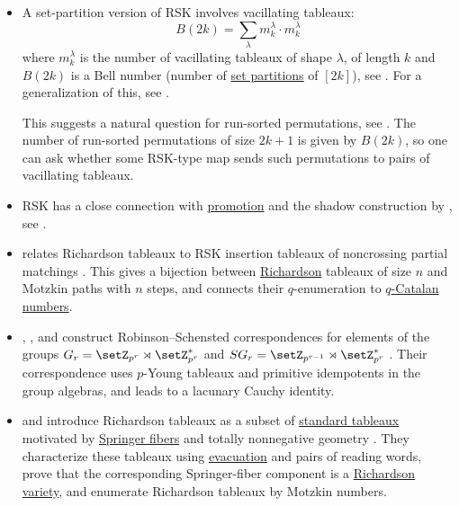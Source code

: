 \begin{itemize}
\item A set-partition version of RSK involves vacillating tableaux:
\[
  B(2k) = \sum_{\lambda} m^{\lambda}_k \cdot m^{\lambda}_k
\]
where $m^{\lambda}_k$ is the number of vacillating tableaux of shape $\lambda$,
of length $k$ and $B(2k)$ is a Bell number (number of
\hyperref[setPartitions]{set partitions} of $[2k]$), see
\cite{HalversonLewandowski2005}.
For a generalization of this, see \cite{BerikkyzyHarrisPunYanZhao2022x}.

This suggests a natural question for run-sorted permutations, see
\cite{AlexanderssonNabawanda2021}.  The number of run-sorted permutations of
size $2k+1$ is given by $B(2k)$, so one can ask whether some RSK-type map sends
such permutations to pairs of vacillating tableaux.


\item RSK has a close connection with \hyperref[promotion]{promotion} and the
shadow construction by , see
\cite{PfannererSwanson2025x}.

\item {} relates Richardson tableaux to RSK insertion tableaux of
noncrossing partial matchings \cite{Guo2025x}.  This gives a bijection between
\hyperref[richardsonVarieties]{Richardson} tableaux of size $n$ and Motzkin
paths with $n$ steps, and connects their $q$-enumeration to
\hyperref[prelimQanalogsCatalan]{$q$-Catalan numbers}.

\item {}, , and  construct
Robinson--Schensted correspondences for elements of the groups
$G_r=\setZ_{p^r}\rtimes \setZ_{p^r}^\ast$ and
$SG_r=\setZ_{p^{r-1}}\rtimes \setZ_{p^r}^\ast$
\cite{ParvathiTamilselviHepsi2025x}.  Their correspondence uses
$p$-Young tableaux and primitive idempotents in the group algebras, and leads
to a lacunary Cauchy identity.

\item {} and  introduce Richardson
tableaux as a subset of \hyperref[prelimTableaux]{standard tableaux} motivated
by \hyperref[springerFibers]{Springer fibers} and totally nonnegative geometry
\cite{KarpPrecup2025x}.  They characterize these tableaux using
\hyperref[evacuation]{evacuation} and pairs of reading words, prove that the
corresponding Springer-fiber component is a
\hyperref[richardsonVarieties]{Richardson variety}, and enumerate Richardson
tableaux by Motzkin numbers.

\end{itemize}
